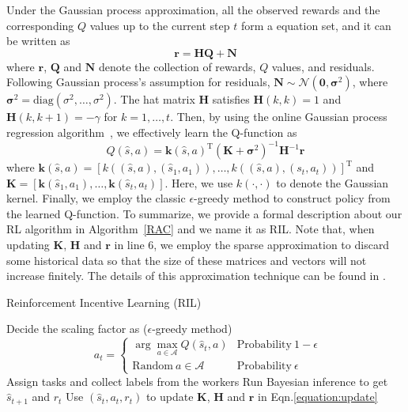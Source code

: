 Under the Gaussian process approximation, all the observed rewards and the corresponding $Q$ values up to the current step $t$ form a equation set, and it can be written as
\begin{equation}
\bm{r}=\bm{H}\bm{Q}+\bm{N}
\end{equation}
where $\bm{r}$, $\bm{Q}$ and $\bm{N}$ denote the collection of rewards, $Q$ values, and residuals. Following Gaussian process's assumption for residuals, $\bm{N}\sim \mathcal{N}(\bm{0},\bm{\sigma}^2)$, where $\bm{\sigma}^2=\textrm{diag}(\sigma^2,\ldots,\sigma^2)$.
The hat matrix $\bm{H}$ satisfies $\bm{H}(k,k)=1$ and $\bm{H}(k,k+1)=-\gamma$ for $k=1,\ldots, t$.
Then, by using the online Gaussian process regression algorithm~\cite{engel2005reinforcement}, we effectively learn the Q-function as
\begin{equation}
\label{equation:update}
Q(\hat{s},a) = \bm{k}(\hat{s},a) ^{\mathrm{T}}(\bm{K} +\bm{\sigma}^2)^{-1}\bm{H}^{-1}\bm{r}
\end{equation}
where $\bm{k}(\hat{s},a)=[k((\hat{s},a), (\hat{s}_1,a_1)),\ldots, k((\hat{s},a), (s_t,a_t))]^{\mathrm{T}}$ and $\bm{K}=[\bm{k}(\hat{s}_1,a_1),\ldots,\bm{k}(\hat{s}_t,a_t)]$. Here, we use $k(\cdot, \cdot)$ to denote the Gaussian kernel.
Finally, we employ the classic $\epsilon$-greedy method to construct policy from the learned Q-function.
To summarize, we provide a formal description about our RL algorithm in Algorithm~\ref{RAC} and we name it as RIL.
Note that, when updating $\bm{K}$, $\bm{H}$ and $\bm{r}$ in line 6, we employ the sparse approximation to discard some historical data so that the size of these matrices and vectors will not increase finitely. The details of this approximation technique can be found in \citet{gasic2014gaussian}.

\begin{algorithm}[tb]
   \caption{Reinforcement Incentive Learning (RIL)}
   \label{RAC}
   \small
\begin{algorithmic}[1]
   \STATE Decide the scaling factor as ($\epsilon$-greedy method)
			$$\ \ a_t=\left\{
			\begin{array}{ll}
				\arg\max_{a\in\mathcal{A}}Q(\hat{s}_t,a) & \mathrm{Probability\ } 1-\epsilon\\
				\mathrm{Random\ } a\in\mathcal{A} & \mathrm{Probability\ } \epsilon
			\end{array}						
			 \right.$$   
   \STATE Assign tasks and collect labels from the workers
   \STATE Run Bayesian inference to get $\hat{s}_{t+1}$ and $r_t$
   \STATE Use $(\hat{s}_t, a_t, r_t)$ to update $\bm{K}$, $\bm{H}$ and $\bm{r}$ in Eqn.\ref{equation:update}
   \ENDFOR
   \ENDFOR
\end{algorithmic}
\end{algorithm}

